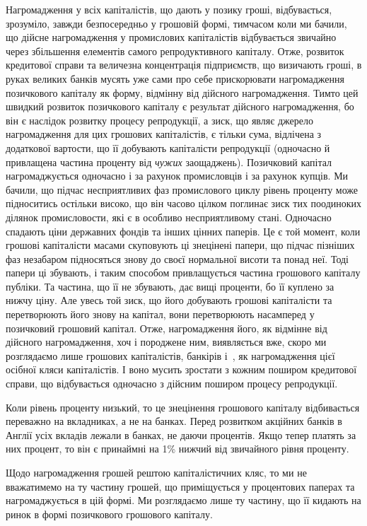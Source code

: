 
Нагромадження у всіх капіталістів, що дають у позику гроші, відбувається,
зрозуміло, завжди безпосередньо у грошовій формі, тимчасом коли ми бачили, що
дійсне нагромадження у промислових капіталістів відбувається звичайно через
збільшення елементів самого репродуктивного капіталу. Отже, розвиток кредитової
справи та величезна концентрація підприємств, що визичають гроші, в руках
великих банків мусять уже сами про себе прискорювати нагромадження позичкового
капіталу як форму, відмінну від дійсного нагромадження. Тимто цей
швидкий розвиток позичкового капіталу є результат дійсного нагромадження,
бо він є наслідок розвитку процесу репродукції, а зиск, що являє джерело нагромадження
для цих грошових капіталістів, є тільки сума, відлічена з додаткової
вартости, що її добувають капіталісти репродукції (одночасно й привлащена
частина проценту від \emph{чужих} заощаджень). Позичковий капітал нагромаджується
одночасно і за рахунок промисловців і за рахунок купців. Ми бачили, що
підчас несприятливих фаз промислового циклу рівень проценту може підноситись
остільки високо, що він часово цілком поглинає зиск тих поодиноких ділянок
промисловости, які є в особливо несприятливому стані. Одночасно спадають ціни
державних фондів та інших цінних паперів. Це є той момент, коли грошові
капіталісти масами скуповують ці знецінені папери, що підчас пізніших фаз
незабаром підносяться знову до своєї нормальної висоти та понад неї. Тоді
папери ці збувають, і таким способом привлащується частина грошового капіталу
публіки. Та частина, що її не збувають, дає вищі проценти, бо її куплено
за нижчу ціну. Але увесь той зиск, що його добувають грошові капіталісти та
перетворюють його знову на капітал, вони перетворюють насамперед у позичковий
грошовий капітал. Отже, нагромадження його, як відмінне від дійсного нагромадження,
хоч і породжене ним, виявляється вже, скоро ми розглядаємо лише грошових
капіталістів, банкірів і~, як нагромадження цієї осібної кляси капіталістів.
І воно мусить зростати з кожним поширом кредитової справи, що відбувається
одночасно з дійсним поширом процесу репродукції.

Коли рівень проценту низький, то це знецінення грошового капіталу відбивається
переважно на вкладниках, а не на банках. Перед розвитком акційних
банків в Англії  усіх вкладів лежали в банках, не даючи процентів. Якщо тепер
платять за них процент, то він є принаймні на 1\% нижчий від звичайного
рівня проценту.

Щодо нагромадження грошей рештою капіталістичних кляс, то ми не
вважатимемо на ту частину грошей, що приміщується у процентових паперах
та нагромаджується в цій формі. Ми розглядаємо лише ту частину, що її кидають
на ринок в формі позичкового грошового капіталу.

